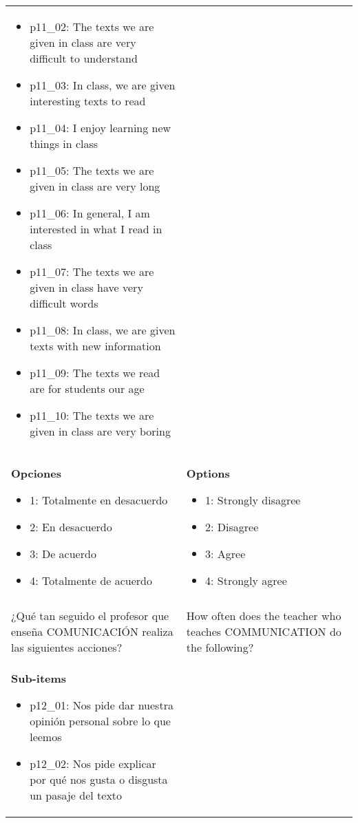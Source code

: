 \documentclass[11pt]{article}
\begin{document}
\begin{longtable}{@{}LL@{}}
\begin{itemize}[leftmargin=*]
\item p11\_02: The texts we are given in class are very difficult to understand
\item p11\_03: In class, we are given interesting texts to read
\item p11\_04: I enjoy learning new things in class
\item p11\_05: The texts we are given in class are very long
\item p11\_06: In general, I am interested in what I read in class
\item p11\_07: The texts we are given in class have very difficult words
\item p11\_08: In class, we are given texts with new information
\item p11\_09: The texts we read are for students our age
\item p11\_10: The texts we are given in class are very boring\end{itemize} \\
\textbf{Opciones}\par\begin{itemize}[leftmargin=*]\item 1: Totalmente en desacuerdo
\item 2: En desacuerdo
\item 3: De acuerdo
\item 4: Totalmente de acuerdo\end{itemize} & \textbf{Options}\par\begin{itemize}[leftmargin=*]\item 1: Strongly disagree
\item 2: Disagree
\item 3: Agree
\item 4: Strongly agree\end{itemize} \\
\addlinespace[4pt]
 \\ 
¿Qué tan seguido el profesor que enseña COMUNICACIÓN realiza las siguientes acciones? & How often does the teacher who teaches COMMUNICATION do the following? \\
\textbf{Sub-items}\par\begin{itemize}[leftmargin=*]\item p12\_01: Nos pide dar nuestra opinión personal sobre lo que leemos
\item p12\_02: Nos pide explicar por qué nos gusta o disgusta un pasaje del texto

\end{itemize}
\end{longtable}
\end{document}
